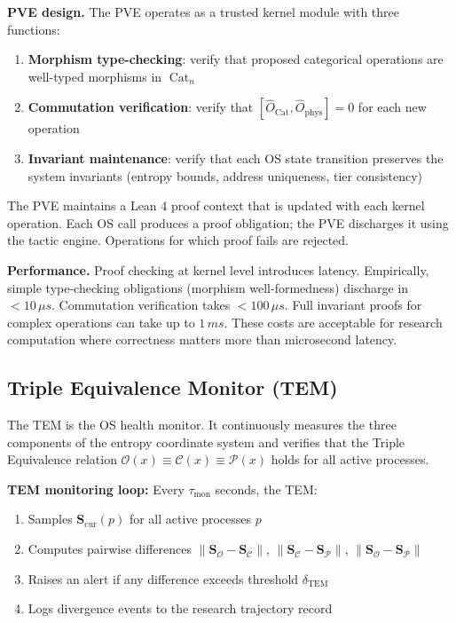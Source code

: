 \documentclass[12pt,twocolumn]{article}
\DeclareMathOperator{\Cat}{Cat}
\begin{document}
\textbf{PVE design.} The PVE operates as a trusted kernel module with three functions:

\begin{enumerate}
\item \textbf{Morphism type-checking}: verify that proposed categorical operations are well-typed morphisms in $\Cat_n$
\item \textbf{Commutation verification}: verify that $[\hat{O}_{\Cat}, \hat{O}_{\text{phys}}] = 0$ for each new operation
\item \textbf{Invariant maintenance}: verify that each OS state transition preserves the system invariants (entropy bounds, address uniqueness, tier consistency)
\end{enumerate}

The PVE maintains a Lean 4 proof context that is updated with each kernel operation. Each OS call produces a proof obligation; the PVE discharges it using the tactic engine. Operations for which proof fails are rejected.

\textbf{Performance.} Proof checking at kernel level introduces latency. Empirically, simple type-checking obligations (morphism well-formedness) discharge in $< 10\,\mu s$. Commutation verification takes $< 100\,\mu s$. Full invariant proofs for complex operations can take up to $1\,ms$. These costs are acceptable for research computation where correctness matters more than microsecond latency.

\subsection{Triple Equivalence Monitor (TEM)}

The TEM is the OS health monitor. It continuously measures the three components of the entropy coordinate system and verifies that the Triple Equivalence relation $\mathcal{O}(x) \equiv \mathcal{C}(x) \equiv \mathcal{P}(x)$ holds for all active processes.

\textbf{TEM monitoring loop:} Every $\tau_{\text{mon}}$ seconds, the TEM:
\begin{enumerate}
\item Samples $\mathbf{S}_{\text{cur}}(p)$ for all active processes $p$
\item Computes pairwise differences $\|\mathbf{S}_{\mathcal{O}} - \mathbf{S}_{\mathcal{C}}\|$, $\|\mathbf{S}_{\mathcal{C}} - \mathbf{S}_{\mathcal{P}}\|$, $\|\mathbf{S}_{\mathcal{O}} - \mathbf{S}_{\mathcal{P}}\|$
\item Raises an alert if any difference exceeds threshold $\delta_{\text{TEM}}$
\item Logs divergence events to the research trajectory record
\end{enumerate}
\end{document}
